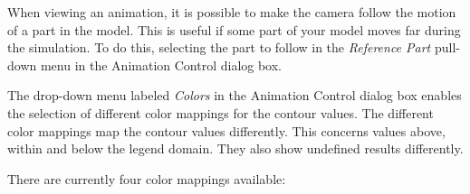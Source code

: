 
When viewing an animation, it is possible to make the camera follow the motion
of a part in the model. This is useful if some part of your model moves far
during the simulation. To do this, selecting the part to follow in the
{\sl Reference Part} pull-down menu in the Animation Control dialog box.




The drop-down menu labeled {\sl Colors} in the Animation Control dialog box
enables the selection of different color mappings for the contour values.
The different color mappings map the contour values differently.
This concerns values above, within and below the legend domain.
They also show undefined results differently.

There are currently four color mappings available:


